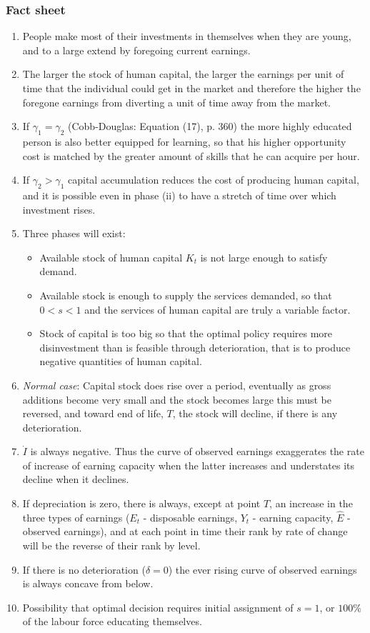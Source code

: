 \documentclass[12pt,a4paper]{article}
\begin{document}
  \subsubsection{Fact sheet} %
  \begin{enumerate}
    \item People make most of their investments in themselves when they are young, and to a large extend by foregoing current earnings.
	\item The larger the stock of human capital, the larger the earnings per unit of time that the individual could get in the market and therefore the higher the foregone earnings from diverting a unit of time away from the market.
	\item If $\gamma _{1} = \gamma _{2}$ (Cobb-Douglas: Equation (17), p. 360) the more highly educated person is also better equipped for learning, so that his higher opportunity cost is matched by the greater amount of skills that he can acquire per hour.
	\item If $\gamma _{2} > \gamma _{1}$ capital accumulation reduces the cost of producing human capital, and it is possible even in phase (ii) to have a stretch of time over which investment rises.
	\item Three phases will exist:
	  \begin{itemize}
	    \item Available stock of human capital $K_t$ is not large enough to satisfy demand.
	    \item Available stock is enough to supply the services demanded, so that $0<s<1$ and the services of human capital are truly a variable factor.
	    \item Stock of capital is too big so that the optimal policy requires more disinvestment than is feasible through deterioration, that is to produce negative quantities of human capital.
	  \end{itemize}
	\item \emph{Normal case}: Capital stock does rise over a period, eventually as gross additions become very small and the stock becomes large this must be reversed, and toward end of life, $T$, the stock will decline, if there is any deterioration.
	\item $\dot{I}$ is always negative. Thus the curve of observed earnings exaggerates the rate of increase of earning capacity when the latter increases and understates its decline when it declines.
	\item If depreciation is zero, there is always, except at point $T$, an increase in the three types of earnings ($E_t$ - disposable earnings, $Y_t$ - earning capacity, $\hat{E}$ - observed earnings), and at each point in time their rank by rate of change will be the reverse of their rank by level.
	\item If there is no deterioration ($\delta = 0$) the ever rising curve of observed earnings is always concave from below.
	\item Possibility that optimal decision requires initial assignment of $s=1$, or $100\%$ of the labour force educating themselves.
  \end{enumerate}
\end{document}
